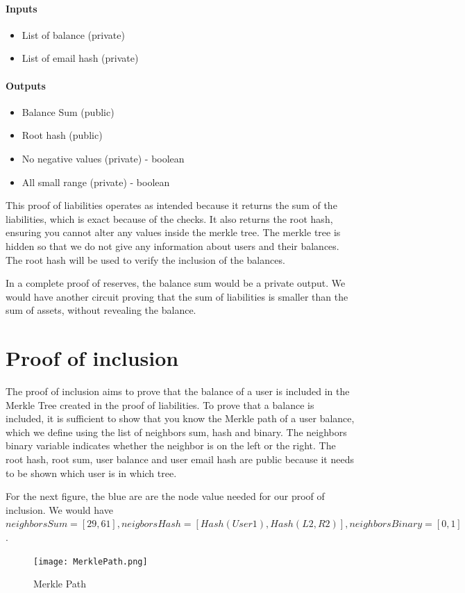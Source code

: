 \paragraph{Inputs}
\begin{itemize}
   \item List of balance (private)
   \item List of email hash (private)
   \end{itemize}

\paragraph{Outputs}
\begin{itemize}
   \item Balance Sum (public)
   \item Root hash (public)
   \item No negative values (private) - boolean
   \item All small range (private) - boolean
   \end{itemize}

This proof of liabilities operates as intended because it returns the sum of the liabilities, which is exact because of the checks.
It also returns the root hash, ensuring you cannot alter any values inside the merkle tree. The merkle tree is hidden so that we do not
give any information about users and their balances.
The root hash will be used to verify the inclusion of the balances.

In a complete proof of reserves, the balance sum would be a private output. We would have another circuit proving that the sum of liabilities is smaller
than the sum of assets, without revealing the balance.

\section{Proof of inclusion}
\label{subsec:pi}
The proof of inclusion aims to prove that the balance of a user is included in the Merkle Tree created in the proof of liabilities.
To prove that a balance is included, it is sufficient to show that you know the Merkle path of a user balance,
which we define using the list of neighbors sum, hash and binary.
The neighbors binary variable indicates whether the neighbor is on the left or the right.
The root hash, root sum, user balance and user email hash are public because it needs to be shown which user is in which tree.

For the next figure, the blue are are the node value needed for our proof of inclusion.
We would have $neighborsSum=[29,61],neigborsHash=[Hash(User1),Hash(L2,R2)],neighborsBinary=[0,1]$.
\begin{figure}[H]
   \centering
   \texttt{[image: MerklePath.png]}
   \caption{Merkle Path}
   \label{overflow}
   \end{figure}

